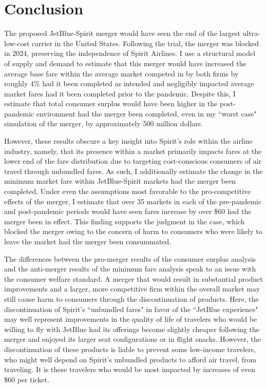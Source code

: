 \documentclass{article}
\begin{document}
	\section{Conclusion}
	\label{sec:Conclusion}
    The proposed JetBlue-Spirit merger would have seen the end of the largest ultra-low-cost carrier in the United States. Following the trial, the merger was blocked in 2024, preserving the independence of Spirit Airlines. I use a structural model of supply and demand to estimate that this merger would have increased the average base fare within the average market competed in by both firms by roughly 4\% had it been completed as intended and negligibly impacted average market fares had it been completed prior to the pandemic. Despite this, I estimate that total consumer surplus would have been higher in the post-pandemic environment had the merger been completed, even in my ``worst case" simulation of the merger, by approximately 500 million dollars. 

    However, these results obscure a key insight into Spirit's role within the airline industry, namely, that its presence within a market primarily impacts fares at the lower end of the fare distribution due to targeting cost-conscious consumers of air travel through unbundled fares. As such, I additionally estimate the change in the minimum market fare within JetBlue-Spirit markets had the merger been completed. Under even the assumptions most favorable to the pro-competitive effects of the merger, I estimate that over 35 markets in each of the pre-pandemic and post-pandemic periods would have seen fares increase by over \$60 had the merger been in effect. This finding supports the judgment in the case, which blocked the merger owing to the concern of harm to consumers who were likely to leave the market had the merger been consummated. 

    The differences between the pro-merger results of the consumer surplus analysis and the anti-merger results of the minimum fare analysis speak to an issue with the consumer welfare standard. A merger that would result in substantial product improvements and a larger, more competitive firm within the overall market may still cause harm to consumers through the discontinuation of products. Here, the discontinuation of Spirit's ``unbundled fares" in favor of the ``JetBlue experience" may well represent improvements in the quality of life of travelers who would be willing to fly with JetBlue had its offerings become slightly cheaper following the merger and enjoyed its larger seat configurations or in flight snacks. However, the discontinuation of these products is liable to prevent some low-income travelers, who might well depend on Spirit's unbundled products to afford air travel, from traveling. It is these travelers who would be most impacted by increases of even \$60 per ticket.  
\end{document}
